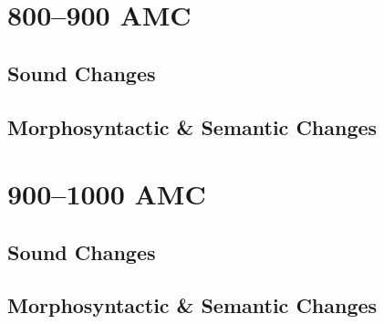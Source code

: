 \documentclass[a4paper,11pt,twoside,openany]{memoir}
\begin{document}


\section{800--900 AMC}

\subsection{Sound Changes}



\subsection{Morphosyntactic \& Semantic Changes}



\section{900--1000 AMC}

\subsection{Sound Changes}



\subsection{Morphosyntactic \& Semantic Changes}


\end{document}
